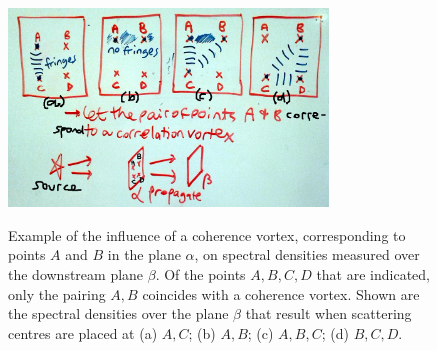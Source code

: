 \documentclass{iucr}              %
\begin{document}
\begin{figure}
\caption{Example of the influence of a coherence vortex, corresponding to points $A$ and $B$ in the plane $\alpha$, on spectral densities measured over the downstream plane $\beta$.  Of the points $A,B,C,D$ that are indicated, only the pairing $A,B$ coincides with a coherence vortex.  Shown are the spectral densities over the plane $\beta$ that result when scattering centres are placed at (a) $A,C$; (b) $A,B$; (c) $A,B,C$; (d) $B,C,D$.}
\includegraphics[width=8.5cm]{Figures/ABCD.png}
\label{fig:ABCD}
\end{figure}
\end{document}
